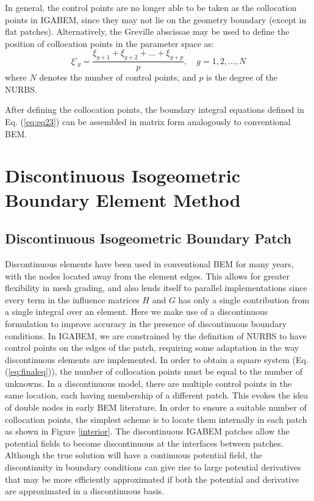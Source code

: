 \documentclass[review]{elsarticle}
\begin{document}
In general, the control points are no longer able to be taken as the collocation points in IGABEM, since they may not lie on the geometry boundary (except in flat patches). Alternatively, the Greville abscissae \cite{Greville, Johnson} may be used to define the position of collocation points in the parameter space as: 
\begin{equation}
\xi'_g=\frac{\xi_{g+1}+\xi_{g+2}+...+\xi_{g+p}}{p}, \quad g=1,2,...,N 
\end{equation}
where $N$ denotes the number of control points, and $p$ is the degree of the NURBS.

After defining the collocation points, the boundary integral equations defined in Eq. (\ref{eq:eq23}) can be assembled in matrix form analogously to conventional BEM.

\section{Discontinuous Isogeometric Boundary Element Method}

\subsection{Discontinuous Isogeometric Boundary Patch}

Discontinuous elements have been used in conventional BEM for many years, with the nodes located away from the element edges. This allows for greater flexibility in mesh grading, and also lends itself to parallel implementations since every term in the influence matrices $H$ and $G$ has only a single contribution from a single integral over an element. Here we make use of a discontinuous formulation to improve accuracy in the presence of discontinuous boundary conditions. In IGABEM, we are constrained by the definition of NURBS to have control points on the edges of the patch, requiring some adaptation in the way discontinuous elements are implemented. In order to obtain a square system (Eq. (\ref{eq:finaleq})), the number of collocation points must be equal to the number of unknowns. In a discontinuous model, there are multiple control points in the same location, each having membership of a different patch. This evokes the idea of double nodes in early BEM literature. In order to ensure a suitable number of collocation points, the simplest scheme is to locate them internally in each patch as shown in Figure \ref{interior}. The discontinuous IGABEM patches allow the potential fields to become discontinuous at the interfaces between patches. Although the true solution will have a continuous potential field, the discontinuity in boundary conditions can give rise to large potential derivatives that may be more efficiently approximated if both the potential and derivative are approximated in a discontinuous basis.
\end{document}
